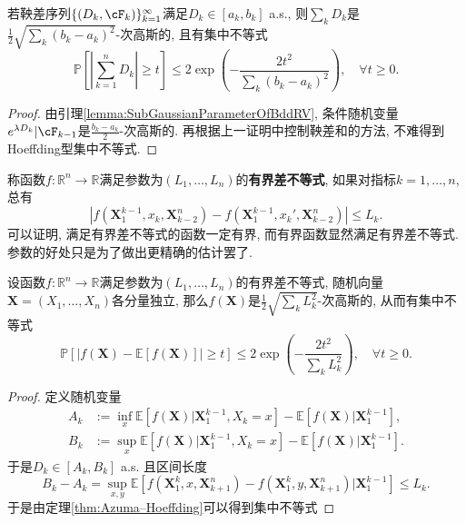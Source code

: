 \begin{theorem}\label{thm:Azuma–Hoeffding}
	若鞅差序列$\{(D_k, \cF_k)\}_{k=1}^{\infty}$满足$D_k \in [a_k, b_k]$ a.s., 则$\sum_k D_k$是$\frac{1}{2}\sqrt{\sum_k (b_k - a_k)^2}$-次高斯的, 且有集中不等式
	\begin{equation*}
		\mathbb{P} \left[ \left| \sum_{k=1}^n D_k \right| \geq t \right]
		\leq 2 \exp \left(- \frac{2 t^2}{\sum_k (b_k - a_k)^2} \right), 
		\quad \forall t \geq 0. 
	\end{equation*}	
\end{theorem}
\begin{proof}
	由引理\ref{lemma:SubGaussianParameterOfBddRV}, 条件随机变量$e^{\lambda D_k} | \cF_{k-1}$是$\frac{b_k - a_k}{2}$-次高斯的. 
	再根据上一证明中控制鞅差和的方法, 不难得到Hoeffding型集中不等式. 
\end{proof}

称函数$f \colon \mathbb{R}^n \to \mathbb{R}$满足参数为$(L_1, \dots, L_n)$的\textbf{有界差不等式}, 如果对指标$k = 1, \dots, n$, 总有
\begin{equation*}
	|f(\bm{X}_1^{k-1}, x_k, \bm{X}_{k-2}^n) - f(\bm{X}_1^{k-1}, x_k', \bm{X}_{k-2}^n)| 
	\leq L_k. 
\end{equation*}
可以证明, 满足有界差不等式的函数一定有界, 而有界函数显然满足有界差不等式. 
参数的好处只是为了做出更精确的估计罢了. 

\begin{corollary}[有界差不等式]\label{cor:BddDiffIneq}
	设函数$f \colon \mathbb{R}^n \to \mathbb{R}$满足参数为$(L_1, \dots, L_n)$的有界差不等式, 随机向量$\bm{X} = (X_1, \dots, X_n)$各分量独立, 那么$f(\bm{X})$是$\frac{1}{2} \sqrt{\sum_k L_k^2}$-次高斯的, 从而有集中不等式
	\begin{equation*}
		\mathbb{P}[|f(\bm{X}) - \mathbb{E}[f(\bm{X})]| \geq t] 
		\leq 2 \exp\left( - \frac{2 t^2}{\sum_k L_k^2} \right), 
		\quad \forall t \geq 0. 
	\end{equation*}
\end{corollary}
\begin{proof}
	定义随机变量 
	\begin{align*}
		A_k &:= \inf_x \mathbb{E}[f(\bm{X})|\bm{X}_1^{k-1}, X_k = x] - \mathbb{E}[f(\bm{X})|\bm{X}_1^{k-1}], \\
		B_k &:= \sup_x \mathbb{E}[f(\bm{X})|\bm{X}_1^{k-1}, X_k = x] - \mathbb{E}[f(\bm{X})|\bm{X}_1^{k-1}]. 
	\end{align*} 
	于是$D_k \in [A_k, B_k]$ a.s. 且区间长度
	\begin{equation*}
		B_k - A_k
		= \sup_{x, y} \mathbb{E}[f(\bm{X}_1^k, x, \bm{X}_{k+1}^n) - f(\bm{X}_1^k, y, \bm{X}_{k+1}^n) | \bm{X}_1^{k-1}] 
		\leq L_k. 
	\end{equation*}
	于是由定理\ref{thm:Azuma–Hoeffding}可以得到集中不等式
\end{proof}

